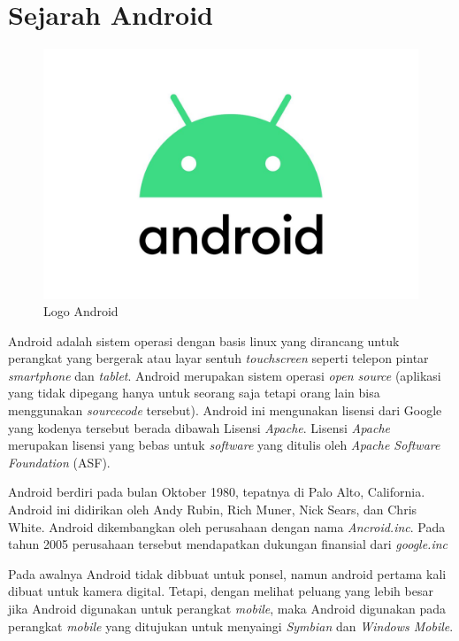 \section{Sejarah Android}

\begin{figure}[H]
    \centering
    \includegraphics[scale=0.2]{pictures/logo_android.jpg}
    \caption{Logo Android}
\end{figure}

Android adalah sistem operasi dengan basis linux yang dirancang untuk perangkat yang bergerak atau layar sentuh \textit{touchscreen} seperti telepon pintar \textit{smartphone} dan \textit{tablet}. Android merupakan sistem operasi \textit{open source} (aplikasi yang tidak dipegang hanya untuk seorang saja tetapi orang lain bisa menggunakan \textit{sourcecode} tersebut). Android ini mengunakan lisensi dari Google yang kodenya tersebut berada dibawah Lisensi \textit{Apache}. Lisensi \textit{Apache} merupakan lisensi yang bebas untuk \textit{software} yang ditulis oleh \textit{Apache Software Foundation} (ASF).

Android berdiri pada bulan Oktober 1980, tepatnya di Palo Alto,  California. Android ini didirikan oleh Andy Rubin, Rich Muner, Nick Sears, dan Chris White. Android dikembangkan oleh perusahaan dengan nama \textit{Ancroid.inc}. Pada tahun 2005 perusahaan tersebut mendapatkan dukungan finansial dari \textit{google.inc}

Pada awalnya Android tidak dibbuat untuk ponsel, namun android pertama kali dibuat untuk kamera digital. Tetapi, dengan melihat peluang yang lebih besar jika Android digunakan untuk perangkat \textit{mobile}, maka Android digunakan pada perangkat \textit{mobile} yang ditujukan untuk menyaingi \textit{Symbian} dan \textit{Windows Mobile}.

